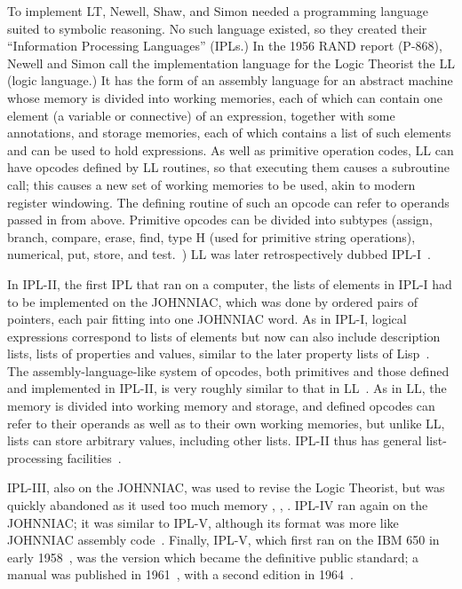 \documentclass[journal]{IEEEtran}
\begin{document}
To implement LT, Newell, Shaw, and Simon needed a programming language
suited to symbolic reasoning. No such language existed, so they
created their ``Information Processing Languages'' (IPLs.) 
In the 1956 RAND report (P-868), Newell and Simon call the implementation
language for the Logic Theorist the LL (logic language.) It has the
form of an assembly language for an abstract machine whose memory
is divided into working memories, each of which can contain one
element (a variable or connective) of an expression, together with
some annotations, and storage memories, each of which contains a
list of such elements and can be used to hold expressions.  As well
as primitive operation codes, LL can have opcodes defined by LL
routines, so that executing them causes a subroutine call; this
causes a new set of working memories to be used, akin to modern register
windowing. The defining routine of such an opcode can refer to
operands passed in from above. Primitive opcodes can be divided
into subtypes (assign, branch, compare, erase, find, type H (used
for primitive string operations), numerical, put, store, and
test.~\cite{LT1956b}) LL was later retrospectively dubbed
IPL-I~\cite[p.~166]{mccorduck2004machines}.

In IPL-II, the first IPL that ran on a computer, the lists of elements
in IPL-I had to be implemented on the JOHNNIAC, which was done by ordered pairs
of pointers, each pair fitting into one JOHNNIAC word.
As in IPL-I, logical expressions correspond to
lists of elements but now can also include description lists,
lists of properties and values, similar to the later property
lists of Lisp~\cite{newellshaw1957}.  The assembly-language-like system of opcodes,
both primitives and those defined and implemented in IPL-II,
is very roughly similar to that in LL~\cite{notes1957}.
As in LL, the memory is
divided into working memory and storage, and defined opcodes
can refer to their operands as well as to their own working
memories, but unlike LL, lists can store arbitrary values,
including other lists. IPL-II thus has general list-processing
facilities~\cite{newellshaw1957}.

IPL-III, also on the JOHNNIAC, was used to
revise the Logic Theorist, but was quickly abandoned
as it used too much memory
\cite[p.~xxi]{newell1964ipl}, \cite[p.~II-18]{cip16june1958},
\cite{cip61957}.
IPL-IV ran again on the JOHNNIAC; it was similar to IPL-V,
although its format was more like JOHNNIAC assembly code~\cite{cip16june1958}.
Finally, IPL-V, which first ran on the IBM 650 in early 1958~\cite{DOC1963,iplv1986},
was the version which became the definitive public standard; a manual
was published in 1961~\cite{newell1961ipl}, with a second edition in
1964~\cite{newell1964ipl}.
\end{document}
